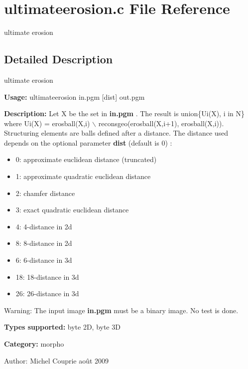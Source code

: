 \section{ultimateerosion.c File Reference}
\label{ultimateerosion_8c}
ultimate erosion 



\subsection{Detailed Description}
ultimate erosion 

{\bf Usage:} ultimateerosion in.pgm [dist] out.pgm

{\bf Description:} Let X be the set in {\bf in.pgm} . The result is union\{Ui(X), i in N\} where Ui(X) = erosball(X,i) $\backslash$ reconsgeo(erosball(X,i+1), erosball(X,i)). Structuring elements are balls defined after a distance. The distance used depends on the optional parameter {\bf dist} (default is 0) : \begin{itemize}
\item 0: approximate euclidean distance (truncated) \item 1: approximate quadratic euclidean distance \item 2: chamfer distance \item 3: exact quadratic euclidean distance \item 4: 4-distance in 2d \item 8: 8-distance in 2d \item 6: 6-distance in 3d \item 18: 18-distance in 3d \item 26: 26-distance in 3d\end{itemize}
\begin{Desc}
\item[Warning:]The input image {\bf in.pgm} must be a binary image. No test is done.\end{Desc}
{\bf Types supported:} byte 2D, byte 3D

{\bf Category:} morpho

\begin{Desc}
\item[Author:]Michel Couprie août 2009 \end{Desc}
